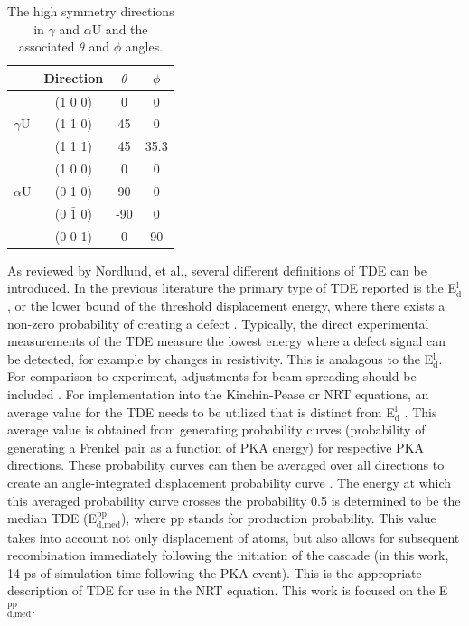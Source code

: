 \documentclass[review]{elsarticle}
\begin{document}
\begin{table}[h]
\caption{The high symmetry directions in $\gamma$ and $\alpha$U and the associated $\theta$ and $\phi$ angles.} \label{tab:dirs}
\begin{center}
\begin{tabular}{|c|c|c|c|}
	\hline
	& Direction & $\theta$ & $\phi$ \\
	 \hline
	 & (1 0 0) & 0 & 0 \\
	$\gamma$U & (1 1 0) & 45 & 0 \\
	& (1 1 1) & 45 & 35.3 \\
	 \hline
	 	 & (1 0 0) & 0 & 0 \\
	$\alpha$U & (0 1 0) & 90 & 0 \\
	& (0 $\bar{1}$ 0) & -90 & 0 \\
	& (0 0 1) & 0 & 90 \\
	 \hline
\end{tabular}
\end{center}
\label{default}
\end{table}


\FloatBarrier

As reviewed by Nordlund, et al.\cite{nordlund2006}, several different definitions of TDE can be introduced. In the previous literature the primary type of TDE reported is the E$^{\textrm{l}}_{\textrm{d}}$, or the lower bound of the threshold displacement energy, where there exists a non-zero probability of creating a defect \cite{malerba2002}. Typically, the direct experimental measurements of the TDE measure the lowest energy where a defect signal can be detected, for example by changes in resistivity. This is analagous to the E$^{\textrm{l}}_{\textrm{d}}$. For comparison to experiment, adjustments for beam spreading should be included \cite{nordlund2006}. For implementation into the Kinchin-Pease or NRT equations, an average value for the TDE needs to be utilized that is distinct from E$^{\textrm{l}}_{\textrm{d}}$ \cite{nordlund2006,norgett1975}. This average value is obtained from generating probability curves (probability of generating a Frenkel pair as a function of PKA energy) for respective PKA directions. These probability curves can then be averaged over all directions to create an angle-integrated displacement probability curve \cite{nordlund2006}. The energy at which this averaged probability curve crosses the probability 0.5 is determined to be the median TDE (E$^{\textrm{pp}}_{\textrm{d,med}}$), where pp stands for production probability. This value takes into account not only displacement of atoms, but also allows for subsequent recombination immediately following the initiation of the cascade (in this work, 14 ps of simulation time following the PKA event). This is the appropriate description of TDE for use in the NRT equation. This work is focused on the E$^{\textrm{pp}}_{\textrm{d,med}}$.
\end{document}
